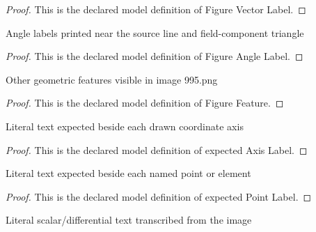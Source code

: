 \begin{proof}
  This is the declared model definition of Figure Vector Label.
\end{proof}
\begin{definition}
  \label{def:physics:phyx-mini-0995:phyxminiproblems-problemphyxmini0995-figureanglelabel}
  Angle labels printed near the source line and field-component triangle
\end{definition}
\begin{proof}
  This is the declared model definition of Figure Angle Label.
\end{proof}
\begin{definition}
  \label{def:physics:phyx-mini-0995:phyxminiproblems-problemphyxmini0995-figurefeature}
  Other geometric features visible in image 995.png
\end{definition}
\begin{proof}
  This is the declared model definition of Figure Feature.
\end{proof}
\begin{definition}
  \label{def:physics:phyx-mini-0995:phyxminiproblems-problemphyxmini0995-expectedaxislabel}
  Literal text expected beside each drawn coordinate axis
\end{definition}
\begin{proof}
  This is the declared model definition of expected Axis Label.
\end{proof}
\begin{definition}
  \label{def:physics:phyx-mini-0995:phyxminiproblems-problemphyxmini0995-expectedpointlabel}
  Literal text expected beside each named point or element
\end{definition}
\begin{proof}
  This is the declared model definition of expected Point Label.
\end{proof}
\begin{definition}
  \label{def:physics:phyx-mini-0995:phyxminiproblems-problemphyxmini0995-expectedscalarlabel}
  Literal scalar/differential text transcribed from the image
\end{definition}
